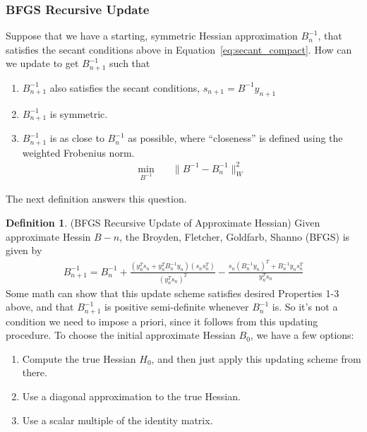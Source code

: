 \documentclass[12pt]{article}
\numberwithin{equation}{section} %
\theoremstyle{plain}
\theoremstyle{definition}
\newtheorem{defn}[thm]{Definition}
\theoremstyle{remark}
\begin{document}
\subsubsection{BFGS Recursive Update}

Suppose that we have a starting, symmetric Hessian approximation $B^{-1}_n$,
that satisfies the secant conditions above in
Equation~\ref{eq:secant_compact}. How can we update to get $B^{-1}_{n+1}$
such that
\begin{enumerate}
  \item $B^{-1}_{n+1}$ also satisfies the secant conditions,
    $s_{n+1} = B^{-1}y_{n+1}$
  \item $B^{-1}_{n+1}$ is symmetric.
  \item $B^{-1}_{n+1}$ is as close to $B^{-1}_n$ as possible, where
    ``closeness'' is defined using the weighted Frobenius norm.
    \begin{align*}
      \min_{B^{-1}} &\quad \lVert B^{-1} - B^{-1}_n\rVert^2_W
    \end{align*}
\end{enumerate}
The next definition answers this question.

\begin{defn}(BFGS Recursive Update of Approximate Hessian)
Given approximate Hessin $B-n$, the Broyden, Fletcher, Goldfarb, Shanno
(BFGS) is given by
\begin{align}
  B_{n+1}^{-1} = B^{-1}_n
  + \frac{(y_n^T s_n + y_n^T B^{-1}_n y_n)(s_n s_n^T)}{(y_n^T s_n)^2}
  - \frac{s_n (B^{-1}_n y_n)^T + B^{-1}_n y_n s_n^T}{y_n^T s_n}
  \label{eq:bfgs}
\end{align}
Some math can show that this update scheme satisfies desired Properties
1-3 above, and that $B^{-1}_{n+1}$ is positive semi-definite whenever
$B^{-1}_n$ is. So it's not a condition we need to impose a priori, since
it follows from this updating procedure.
To choose the initial approximate Hessian $B_0$, we have a few options:
\begin{enumerate}
  \item Compute the true Hessian $H_0$, and then just apply this
    updating scheme from there.
  \item Use a diagonal approximation to the true Hessian.
  \item Use a scalar multiple of the identity matrix.
\end{enumerate}
\end{defn}
\end{document}
